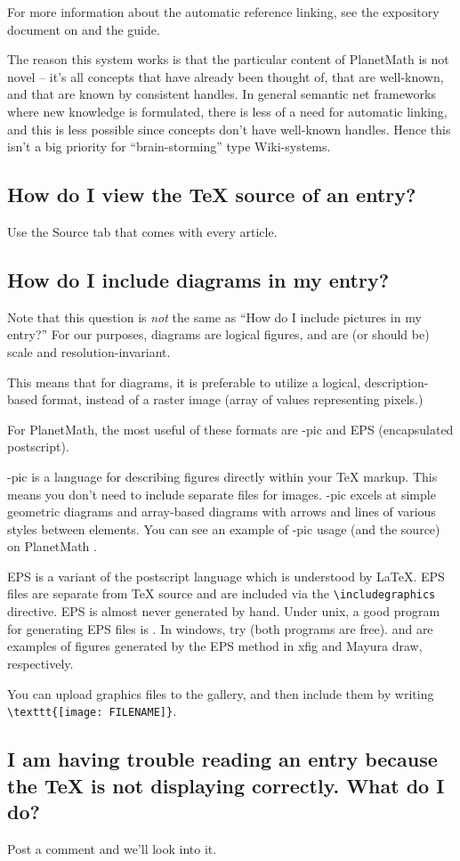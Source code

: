 For more information about the automatic reference linking, see the expository document on  and the  guide.

The reason this system works is that the particular content of PlanetMath is not novel -- it's all concepts that have already been thought of, that are well-known, and that are known by consistent handles. In general semantic net frameworks where new knowledge is formulated, there is less of a need for automatic linking, and this is less possible since concepts don't have well-known handles. Hence this isn't a big priority for ``brain-storming'' type Wiki-systems.

\subsection{How do I view the \TeX{} source of an entry?}
Use the Source tab that comes with every article.

\subsection{How do I include diagrams in my entry?}
Note that this question is \emph{not} the same as ``How do I include pictures in my entry?'' For our purposes, diagrams are logical figures, and are (or should be) scale and resolution-invariant.

This means that for diagrams, it is preferable to utilize a logical, description-based format, instead of a raster image (array of values representing pixels.)

For PlanetMath, the most useful of these formats are \Xy-pic and EPS (encapsulated postscript).

\Xy-pic is a language for describing figures directly within your TeX markup. This means you don't need to include separate files for images. \Xy-pic excels at simple geometric diagrams and array-based diagrams with arrows and lines of various styles between elements. You can see an example of \Xy-pic usage (and the source) on PlanetMath .

EPS is a variant of the postscript language which is understood by \LaTeX. EPS files are separate from \TeX{} source and are included via the \texttt{\textbackslash{}includegraphics} directive. EPS is almost never generated by hand. Under unix, a good program for generating EPS files is . In windows, try  (both programs are free).  and  are examples of figures generated by the EPS method in xfig and Mayura draw, respectively.

You can upload graphics files to the gallery, and then include them by writing \verb|\texttt{[image: FILENAME]}|.

\subsection{I am having trouble reading an entry because the \TeX{} is not displaying correctly.  What do I do?}
Post a comment and we'll look into it.
